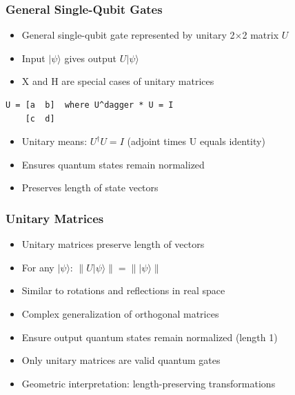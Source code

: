 \begin{frame}[fragile]\frametitle{General Single-Qubit Gates}
\begin{itemize}
\item General single-qubit gate represented by unitary 2$\times$2 matrix $U$
\item Input $|\psi\rangle$ gives output $U|\psi\rangle$
\item X and H are special cases of unitary matrices
\end{itemize}
\begin{lstlisting}
U = [a  b]  where U^dagger * U = I
    [c  d]
\end{lstlisting}
\begin{itemize}
\item Unitary means: $U^\dagger U = I$ (adjoint times U equals identity)
\item Ensures quantum states remain normalized
\item Preserves length of state vectors
\end{itemize}
\end{frame}

\begin{frame}[fragile]\frametitle{Unitary Matrices}
\begin{itemize}
\item Unitary matrices preserve length of vectors
\item For any $|\psi\rangle$: $\|U|\psi\rangle\| = \||\psi\rangle\|$
\item Similar to rotations and reflections in real space
\item Complex generalization of orthogonal matrices
\item Ensure output quantum states remain normalized (length 1)
\item Only unitary matrices are valid quantum gates
\item Geometric interpretation: length-preserving transformations
\end{itemize}
\end{frame}

